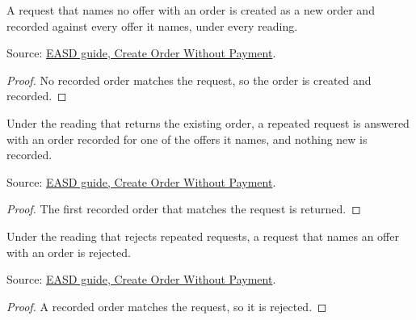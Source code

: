 \begin{theorem}
  \label{thm:order-creation-records-offers}
  A request that names no offer with an order is created as a new order and
  recorded against every offer it names, under every reading.

  Source: \href{https://standards.atlassian.net/wiki/spaces/EASD/pages/574455879/Create+Order+Without+Payment}{EASD guide, Create Order Without Payment}.
\end{theorem}
\begin{proof}
  No recorded order matches the request, so the order is created and
  recorded.
\end{proof}

\begin{theorem}
  \label{thm:order-creation-repeat-existing}
  Under the reading that returns the existing order, a repeated request is
  answered with an order recorded for one of the offers it names, and nothing
  new is recorded.

  Source: \href{https://standards.atlassian.net/wiki/spaces/EASD/pages/574455879/Create+Order+Without+Payment}{EASD guide, Create Order Without Payment}.
\end{theorem}
\begin{proof}
  The first recorded order that matches the request is returned.
\end{proof}

\begin{theorem}
  \label{thm:order-creation-repeat-rejected}
  Under the reading that rejects repeated requests, a request that names an
  offer with an order is rejected.

  Source: \href{https://standards.atlassian.net/wiki/spaces/EASD/pages/574455879/Create+Order+Without+Payment}{EASD guide, Create Order Without Payment}.
\end{theorem}
\begin{proof}
  A recorded order matches the request, so it is rejected.
\end{proof}

